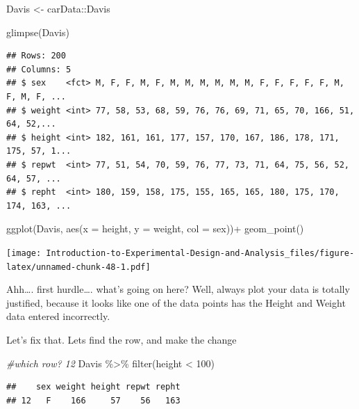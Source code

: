 \documentclass[
]{book}
\newenvironment{Shaded}{\begin{snugshade}}{\end{snugshade}}
\newcommand{\AttributeTok}[1]{\textcolor[rgb]{0.77,0.63,0.00}{#1}}
\newcommand{\CommentTok}[1]{\textcolor[rgb]{0.56,0.35,0.01}{\textit{#1}}}
\newcommand{\DecValTok}[1]{\textcolor[rgb]{0.00,0.00,0.81}{#1}}
\newcommand{\FunctionTok}[1]{\textcolor[rgb]{0.00,0.00,0.00}{#1}}
\newcommand{\NormalTok}[1]{#1}
\newcommand{\OtherTok}[1]{\textcolor[rgb]{0.56,0.35,0.01}{#1}}
\newcommand{\SpecialCharTok}[1]{\textcolor[rgb]{0.00,0.00,0.00}{#1}}
\begin{document}
\begin{Shaded}
\begin{Highlighting}[]
\NormalTok{Davis }\OtherTok{\textless{}{-}}\NormalTok{ carData}\SpecialCharTok{::}\NormalTok{Davis}

\FunctionTok{glimpse}\NormalTok{(Davis)}
\end{Highlighting}
\end{Shaded}

\begin{verbatim}
## Rows: 200
## Columns: 5
## $ sex    <fct> M, F, F, M, F, M, M, M, M, M, M, F, F, F, F, F, M, F, M, F, ...
## $ weight <int> 77, 58, 53, 68, 59, 76, 76, 69, 71, 65, 70, 166, 51, 64, 52,...
## $ height <int> 182, 161, 161, 177, 157, 170, 167, 186, 178, 171, 175, 57, 1...
## $ repwt  <int> 77, 51, 54, 70, 59, 76, 77, 73, 71, 64, 75, 56, 52, 64, 57, ...
## $ repht  <int> 180, 159, 158, 175, 155, 165, 165, 180, 175, 170, 174, 163, ...
\end{verbatim}

\begin{Shaded}
\begin{Highlighting}[]
\FunctionTok{ggplot}\NormalTok{(Davis, }\FunctionTok{aes}\NormalTok{(}\AttributeTok{x =}\NormalTok{ height, }\AttributeTok{y =}\NormalTok{ weight, }\AttributeTok{col =}\NormalTok{ sex))}\SpecialCharTok{+}
  \FunctionTok{geom\_point}\NormalTok{()}
\end{Highlighting}
\end{Shaded}

\texttt{[image: Introduction-to-Experimental-Design-and-Analysis\_files/figure-latex/unnamed-chunk-48-1.pdf]}

Ahh\ldots. first hurdle\ldots. what's going on here? Well, always plot your data is totally justified, because it looks like one of the data points has the Height and Weight data entered incorrectly.

Let's fix that. Lets find the row, and make the change

\begin{Shaded}
\begin{Highlighting}[]
\CommentTok{\#which row? 12}
\NormalTok{Davis }\SpecialCharTok{\%\textgreater{}\%} \FunctionTok{filter}\NormalTok{(height }\SpecialCharTok{\textless{}} \DecValTok{100}\NormalTok{)}
\end{Highlighting}
\end{Shaded}

\begin{verbatim}
##    sex weight height repwt repht
## 12   F    166     57    56   163
\end{verbatim}
\end{document}
